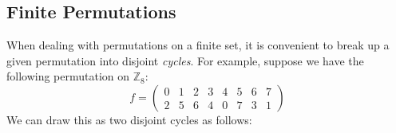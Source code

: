     \subsection{Finite Permutations}
        When dealing with permutations on a finite set, it is convenient to
        break up a given permutation into disjoint \textit{cycles}. For example,
        suppose we have the following permutation on $\mathbb{Z}_{8}$:
        \begin{equation}
            f=
            \begin{pmatrix}
                0&1&2&3&4&5&6&7\\
                2&5&6&4&0&7&3&1
            \end{pmatrix}
        \end{equation}
        We can draw this as two disjoint cycles as follows:
